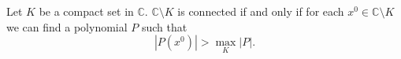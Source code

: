 
Let $K$ be a compact set in $\mathbb{C}$. $\mathbb{C} \setminus K$ is connected if and only if for each $x^0 \in \mathbb{C} \setminus K$ we can find a polynomial $P$ such that
$$|P(x^0)| > \max_K |P|.$$
